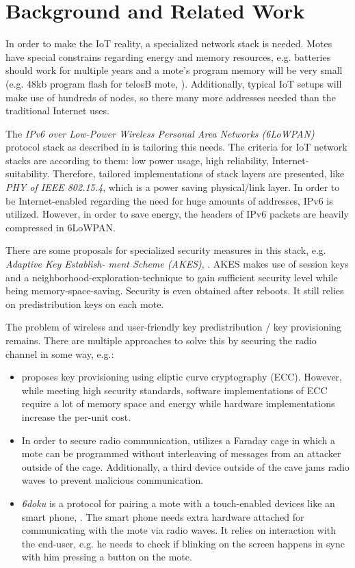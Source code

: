 \documentclass{sig-alternate} %
\begin{document}
\section{Background and Related Work}
\label{sec:related_work}

In order to make the IoT reality, a specialized network stack is needed.
Motes have special constrains regarding energy and memory resources, e.g. batteries should work for multiple years and a mote's program memory will be very small (e.g. 48kb program flash for telosB mote, \cite{telosb}).
Additionally, typical IoT setups will make use of hundreds of nodes, so there many more addresses needed than the traditional Internet uses.

The \textit{IPv6 over Low-Power Wireless Personal Area Networks (6LoWPAN)} protocol stack as described in \cite{palattella2013standardized} is tailoring this needs.
The criteria for IoT network stacks are according to them: low power usage, high reliability, Internet-suitability.
Therefore, tailored implementations of stack layers are presented, like \textit{PHY of IEEE 802.15.4}, which is a power saving physical/link layer.
In order to be Internet-enabled regarding the need for huge amounts of addresses, IPv6 is utilized.
However, in order to save energy, the headers of IPv6 packets are heavily compressed in 6LoWPAN.

There are some proposals for specialized security measures in this stack, e.g. \textit{Adaptive Key Establish- ment Scheme (AKES)}, \cite{krentz15akes}.
AKES makes use of session keys and a neighborhood-exploration-technique to gain sufficient security level while being memory-space-saving.
Security is even obtained after reboots.
It still relies on predistribution keys on each mote.

The problem of wireless and user-friendly key predistribution / key provisioning remains.
There are multiple approaches to solve this by securing the radio channel in some way, e.g.:

\begin{itemize}
	\item \cite{chen2011over} proposes key provisioning using eliptic curve cryptography (ECC). However, while meeting high security standards, software implementations of ECC require a lot of memory space and energy while hardware implementations increase the per-unit cost.
	\item In order to secure radio communication, \cite{kuo2007message} utilizes a Faraday cage in which a mote can be programmed without interleaving of messages from an attacker outside of the cage. Additionally, a third device outside of the cave jams radio waves to prevent malicious communication.
	\item \textit{6doku} is a protocol for pairing  a mote with a touch-enabled devices like an smart phone, \cite{krentz20156doku}. The smart phone needs extra hardware attached for communicating with the mote via radio waves. It relies on interaction with the end-user, e.g. he needs to check if blinking on the screen happens in sync with him pressing a button on the mote.
\end{itemize}
\end{document}
